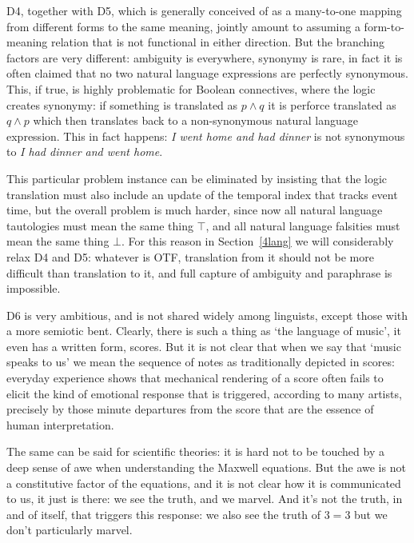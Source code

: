 \documentclass[output=paper,colorlinks=true,citecolor=brown]{langscibook}
\begin{document}
D4, together with D5, which is generally conceived of as a many-to-one mapping
from different forms to the same meaning, jointly amount to assuming a
form-to-meaning relation that is not functional in either direction. But the
branching factors are very different: ambiguity is everywhere, synonymy is
rare, in fact it is often claimed that no two natural language expressions are
perfectly synonymous. This, if true, is highly problematic for Boolean
connectives, where the logic creates synonymy: if something is translated as
$p \wedge q$ it is perforce translated as $q \wedge p$ which then translates
back to a non-synonymous natural language expression. This in fact happens:
\emph{I went home and had dinner} is not synonymous to \emph{I had dinner and
  went home}.

This particular problem instance can be eliminated by insisting that the logic
translation must also include an update of the temporal index that tracks event
time, but the overall problem is much harder, since now all natural language
tautologies must mean the same thing $\top$, and all natural language
falsities must mean the same thing $\bot$. For this reason in
Section~\ref{4lang} we will considerably relax D4 and D5: whatever is OTF,
translation from it should not be more difficult than translation to it, and
full capture of ambiguity and paraphrase is impossible. 

\medskip\noindent D6 is very ambitious, and is not shared widely among
linguists, except those with a more semiotic bent. Clearly, there is such a
thing as `the language of music', it even has a written form, scores. But it
is not clear that when we say that `music speaks to us' we mean the sequence
of notes as traditionally depicted in scores: everyday experience shows that
mechanical rendering of a score often fails to elicit the kind of emotional
response that is triggered, according to many artists, precisely by those minute
departures from the score that are the essence of human interpretation.

The same can be said for scientific theories: it is hard not to be touched by
a deep sense of awe when understanding the Maxwell equations. But the awe is
not a constitutive factor of the equations, and it is not clear how it is
communicated to us, it just is there: we see the truth, and we marvel. And
it's not the truth, in and of itself, that triggers this response: we also see
the truth of $3=3$ but we don't particularly marvel.
\end{document}
